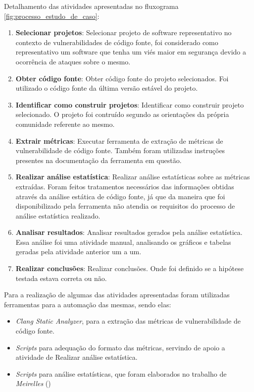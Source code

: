 Detalhamento das atividades apresentadas no fluxograma
\ref{fig:processo_estudo_de_caso}:

\begin{enumerate}\label{desc_processo}
  \item \textbf{Selecionar projetos}: Selecionar projeto de software representativo no contexto de
    vulnerabilidades de código fonte, foi considerado como representativo um
    software que tenha um viés maior em segurança devido a ocorrência de ataques
    sobre o mesmo.
  \item \textbf{Obter código fonte}: Obter código fonte do projeto selecionados. Foi utilizado o código fonte
  da última versão estável do projeto.
  \item \textbf{Identificar como construir projetos}: Identificar como construir projeto selecionado. O projeto foi contruído
    segundo as orientações da própria comunidade referente ao mesmo.
  \item \textbf{Extrair métricas}: Executar ferramenta de extração de métricas de vulnerabilidade de código
    fonte. Também foram utilizadas instruções presentes na documentação da
    ferramenta em questão.
  \item \textbf{Realizar análise estatística}: Realizar análise estatísticas sobre as métricas extraídas. Foram feitos
    tratamentos necessários das informações obtidas através da análise estática
    de código fonte, já que da maneira que foi disponibilizado pela ferramenta
    não atendia os requisitos do processo de análise estatística realizado.
  \item \textbf{Analisar resultados}: Analisar resultados gerados pela análise estatística. Essa análise foi uma atividade
    manual, analisando os gráficos e tabelas geradas pela atividade anterior um
    a um.
  \item \textbf{Realizar conclusões}: Realizar conclusões. Onde foi definido se a hipótese testada estava
    correta ou não.
\end{enumerate}

Para a realização de algumas das atividades apresentadas foram utilizadas
ferramentas para a automação das mesmas, sendo elas:

\begin{itemize}
  \item \textit{Clang Static Analyzer}, para a extração das métricas de
    vulnerabilidade de código fonte.
  \item \textit{Scripts} para adequação do formato das métricas, servindo de
    apoio a atividade de Realizar análise estatística.
  \item \textit{Scripts} para análise estatísticas, que foram elaborados no
    trabalho de \emph{Meirelles} (\citeyear{meirelles2013})
\end{itemize}

